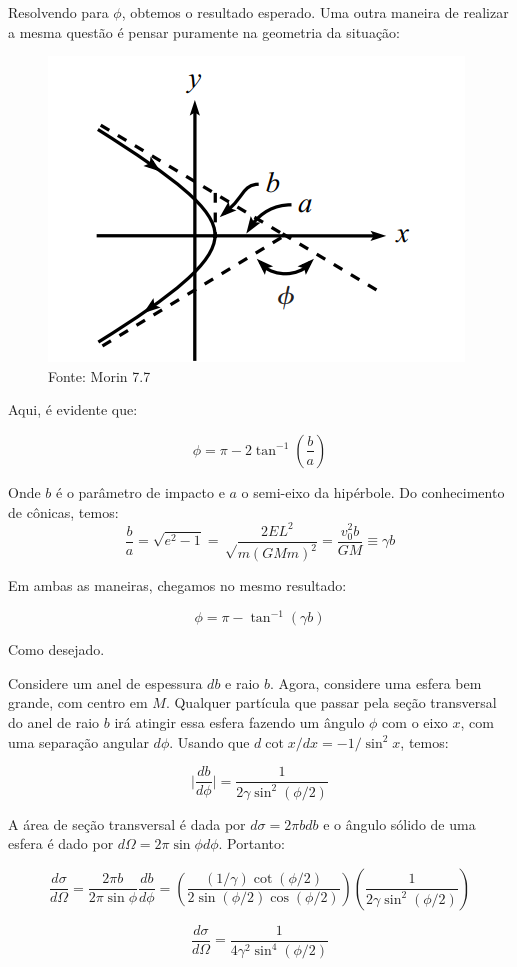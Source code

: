 \documentclass[11pt]{article}
\begin{document}
\begin{pproblem}
\begin{pssolution*}{}{}
\begin{alternativas}
            Resolvendo para \(\phi\), obtemos o resultado esperado. Uma outra maneira de realizar a mesma questão é pensar puramente na geometria da situação:
            \begin{figure}[H]
                \centering
                \includegraphics[width=0.7\linewidth]{imagens/morin hiperbole.png}
                \caption{Fonte: Morin 7.7}
            \end{figure}

            Aqui, é evidente que:

            \[\phi = \pi - 2\tan^{-1}\left(\frac{b}{a}\right)\]

            Onde \(b\) é o parâmetro de impacto e \(a\) o semi-eixo da hipérbole. Do conhecimento de cônicas, temos:
            \[\frac{b}{a} = \sqrt{e^2-1} = \sqrt\frac{2EL^2}{m(GMm)^2} = \frac{v_0^2b}{GM} \equiv \gamma b\]

            Em ambas as maneiras, chegamos no mesmo resultado:

            \[\boxed{\phi = \pi - \tan^{-1}(\gamma b)}\]

            Como desejado.

            \item Considere um anel de espessura \(db\) e raio \(b\). Agora, considere uma esfera bem grande, com centro em \(M\). Qualquer partícula que passar pela seção transversal do anel de raio \(b\) irá atingir essa esfera fazendo um ângulo \(\phi\) com o eixo \(x\), com uma separação angular \(d\phi\). Usando que \(d\cot x/dx = -1/\sin^2x\), temos:
            
            \[\big|\frac{db}{d\phi}\big| = \frac{1}{2\gamma \sin^2(\phi/2)}\]

            A área de seção transversal é dada por \(d\sigma = 2\pi bdb\) e o ângulo sólido de uma esfera é dado por \(d\Omega = 2\pi \sin\phi d\phi\). Portanto:

            \[\frac{d\sigma}{d\Omega} = \frac{2\pi b}{2\pi \sin \phi}\frac{db}{d\phi} = \left(\frac{(1/\gamma)\cot(\phi/2)}{2\sin(\phi/2)\cos(\phi/2)}\right)\left(\frac{1}{2\gamma\sin^2(\phi/2)}\right)\]

            \[\boxed{\frac{d\sigma}{d\Omega} = \frac{1}{4\gamma^2\sin^4(\phi/2)}}\]
        \end{alternativas}            
    \end{pssolution*}
\end{pproblem}
\end{document}
